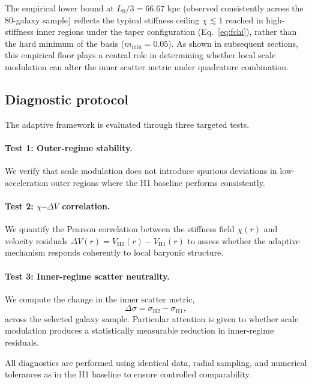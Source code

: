 \documentclass{aa}
\begin{document}
The empirical lower bound at $L_0/3 = 66.67$ kpc (observed consistently across
the 80-galaxy sample) reflects the typical stiffness ceiling $\chi \lesssim 1$
reached in high-stiffness inner regions under the taper configuration
(Eq.~\ref{eq:fchi}), rather than the hard minimum of the basis
($m_{\min} = 0.05$). As shown in subsequent sections, this empirical floor
plays a central role in determining whether local scale modulation can alter
the inner scatter metric under quadrature combination.

\subsection{Diagnostic protocol}

The adaptive framework is evaluated through three targeted tests.

\paragraph{Test 1: Outer-regime stability.}
We verify that scale modulation does not introduce spurious deviations in 
low-acceleration outer regions where the H1 baseline performs consistently.

\paragraph{Test 2: $\chi$--$\Delta V$ correlation.}
We quantify the Pearson correlation between the stiffness field $\chi(r)$ 
and velocity residuals $\Delta V(r) = V_{\mathrm{H2}}(r) - V_{\mathrm{H1}}(r)$ 
to assess whether the adaptive mechanism responds coherently to local 
baryonic structure.

\paragraph{Test 3: Inner-regime scatter neutrality.}
We compute the change in the inner scatter metric,
\begin{equation}
	\Delta \sigma = \sigma_{\mathrm{H2}} - \sigma_{\mathrm{H1}},
	\label{eq:scatter}
\end{equation}
across the selected galaxy sample. Particular attention is given to whether 
scale modulation produces a statistically measurable reduction in inner-regime 
residuals.

All diagnostics are performed using identical data, radial sampling, and 
numerical tolerances as in the H1 baseline to ensure controlled comparability.
\end{document}
